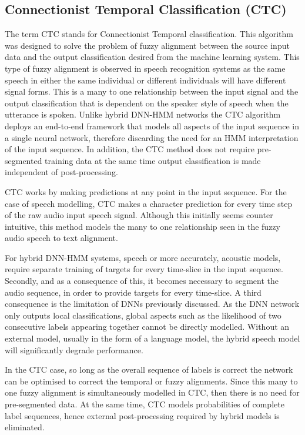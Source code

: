 \subsection{Connectionist Temporal Classification (CTC)}
The term CTC stands for Connectionist Temporal classification.  This algorithm was designed to solve the problem of fuzzy alignment between the source input data and the output classification desired from the machine learning system.  This type of fuzzy alignment is observed in speech recognition systems as the same speech in either the same individual or different individuals will have different signal forms.  This is a many to one relationship between the input signal and the output classification that is dependent on the speaker style of speech when the utterance is spoken.  Unlike hybrid DNN-HMM networks the CTC algorithm deploys an end-to-end framework that models all aspects of the input sequence in a single neural network, therefore discarding the need for an HMM interpretation of the input sequence. In  addition, the CTC method does not require pre-segmented training data at the same time output classification is made independent of post-processing.

CTC works by making predictions at any point in the input sequence. For the case of speech modelling,  CTC makes a character prediction for every time step of the raw audio input speech signal. Although this initially seems counter intuitive, this method models the many to one relationship seen in the fuzzy audio speech to text alignment. 

For hybrid DNN-HMM systems, speech or more accurately, acoustic models, require separate training of targets for every time-slice in the input sequence. Secondly, and  as a consequence of this, it becomes necessary to segment the audio sequence, in order to provide targets for every time-slice. A third consequence is the limitation of DNNs previously discussed. As the DNN network only outputs local classifications, global aspects such as the likelihood of two consecutive labels appearing together cannot be directly modelled.  Without an external model, usually in the form of a language model, the hybrid speech model will significantly degrade performance.

In the CTC case, so long as the overall sequence of labels is correct the network can be optimised to correct the temporal or fuzzy alignments. Since this many to one fuzzy alignment is simultaneously modelled in CTC, then there is no need for pre-segmented data. At the same time, CTC models probabilities of complete label sequences, hence external post-processing required by hybrid models is eliminated.

